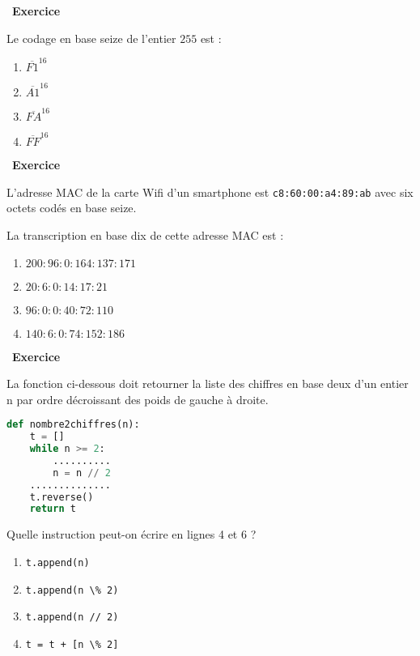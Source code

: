 \documentclass[
  11pt,
]{article}
\newcommand{\passthrough}[1]{#1}
\providecommand{\tightlist}{%
  \setlength{\itemsep}{0pt}\setlength{\parskip}{0pt}}
\newcounter{exo}
\newenvironment{exercice}[1]
{\par \medskip   \addtocounter{exo}{1} \noindent  
\begin{bclogo}[arrondi =0.1,   noborder = true, logo=\bccrayon, marge=4]{~\textbf{Exercice} \textbf{\theexo} {\itshape #1} }  \par}
{
\end{bclogo}
 \par \bigskip }
\newcounter{def}
\begin{document}
\begin{exercice}{}

Le codage en base seize de l'entier \(255\) est :

\begin{enumerate}
\def\labelenumi{\arabic{enumi}.}
\tightlist
\item
  \(\overline{F1}^{16}\)
\item
  \(\overline{A1}^{16}\)
\item
  \(\overline{FA}^{16}\)
\item
  \(\overline{FF}^{16}\)
\end{enumerate}

\end{exercice}

\begin{exercice}{}

L'adresse MAC de la carte Wifi d'un smartphone est
\texttt{c8:60:00:a4:89:ab} avec six octets codés en base seize.

La transcription en base dix de cette adresse MAC est :

\begin{enumerate}
\def\labelenumi{\arabic{enumi}.}
\tightlist
\item
  \(200:96:0:164:137:171\)
\item
  \(20:6:0:14:17:21\)
\item
  \(96:0:0:40:72:110\)
\item
  \(140:6:0:74:152:186\)
\end{enumerate}

\end{exercice}

\begin{exercice}{}

La fonction ci-dessous doit retourner la liste des chiffres en base deux
d'un entier n par ordre décroissant des poids de gauche à droite.

\begin{lstlisting}[language=Python]
def nombre2chiffres(n):
    t = []
    while n >= 2:
        ..........
        n = n // 2
    ..............
    t.reverse()
    return t
\end{lstlisting}

Quelle instruction peut-on écrire en lignes 4 et 6 ?

\begin{enumerate}
\def\labelenumi{\arabic{enumi}.}
\tightlist
\item
  \passthrough{\lstinline!t.append(n)!}
\item
  \passthrough{\lstinline!t.append(n \% 2)!}
\item
  \passthrough{\lstinline!t.append(n // 2)!}
\item
  \passthrough{\lstinline!t = t + [n \% 2]!}
\end{enumerate}

\end{exercice}
\end{document}
